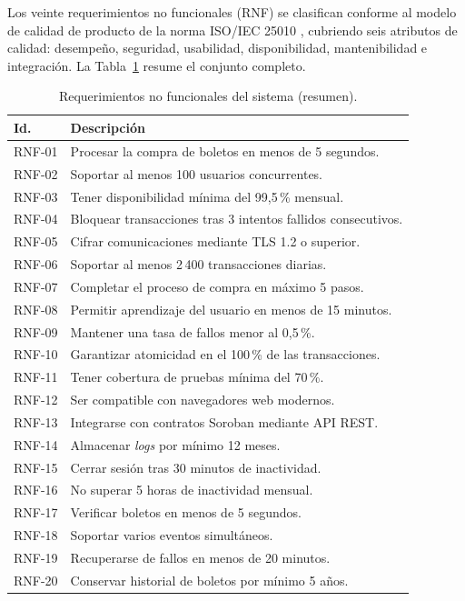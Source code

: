 Los veinte requerimientos no funcionales (RNF) se clasifican conforme al modelo de calidad de producto de la
norma ISO/IEC 25010 \cite{iso25010}, cubriendo seis atributos de calidad: desempeño, seguridad, usabilidad,
disponibilidad, mantenibilidad e integración. La Tabla~\ref{tab:rnf} resume el conjunto completo.

\begin{table}[H]
\centering
\scriptsize
\renewcommand{\arraystretch}{1.3}
\caption{Requerimientos no funcionales del sistema (resumen).}
\label{tab:rnf}
\begin{tabularx}{\textwidth}{>{\raggedright\arraybackslash}p{1.2cm} >{\raggedright\arraybackslash}X}
\toprule
\rowcolor{rowgray}
\textbf{Id.} & \textbf{Descripción} \\
\midrule
RNF-01 & Procesar la compra de boletos en menos de 5 segundos. \\
\rowcolor{rowgray}
RNF-02 & Soportar al menos 100 usuarios concurrentes. \\
RNF-03 & Tener disponibilidad mínima del 99{,}5\,\% mensual. \\
\rowcolor{rowgray}
RNF-04 & Bloquear transacciones tras 3 intentos fallidos consecutivos. \\
RNF-05 & Cifrar comunicaciones mediante TLS 1.2 o superior. \\
\rowcolor{rowgray}
RNF-06 & Soportar al menos 2\,400 transacciones diarias. \\
RNF-07 & Completar el proceso de compra en máximo 5 pasos. \\
\rowcolor{rowgray}
RNF-08 & Permitir aprendizaje del usuario en menos de 15 minutos. \\
RNF-09 & Mantener una tasa de fallos menor al 0{,}5\,\%. \\
\rowcolor{rowgray}
RNF-10 & Garantizar atomicidad en el 100\,\% de las transacciones. \\
RNF-11 & Tener cobertura de pruebas mínima del 70\,\%. \\
\rowcolor{rowgray}
RNF-12 & Ser compatible con navegadores web modernos. \\
RNF-13 & Integrarse con contratos Soroban mediante API REST. \\
\rowcolor{rowgray}
RNF-14 & Almacenar \textit{logs} por mínimo 12 meses. \\
RNF-15 & Cerrar sesión tras 30 minutos de inactividad. \\
\rowcolor{rowgray}
RNF-16 & No superar 5 horas de inactividad mensual. \\
RNF-17 & Verificar boletos en menos de 5 segundos. \\
\rowcolor{rowgray}
RNF-18 & Soportar varios eventos simultáneos. \\
RNF-19 & Recuperarse de fallos en menos de 20 minutos. \\
\rowcolor{rowgray}
RNF-20 & Conservar historial de boletos por mínimo 5 años. \\
\bottomrule
\end{tabularx}
\end{table}

